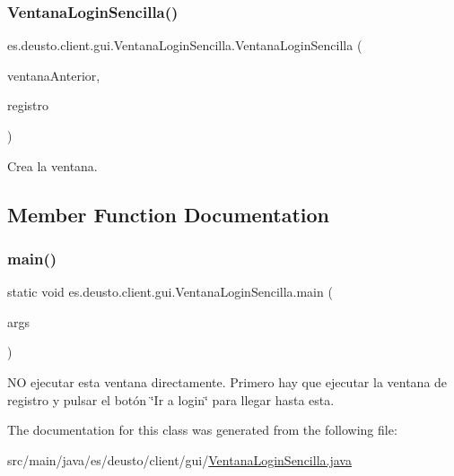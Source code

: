 \subsubsection{\texorpdfstring{VentanaLoginSencilla()}{VentanaLoginSencilla()}}
{\footnotesize\ttfamily es.\+deusto.\+client.\+gui.\+Ventana\+Login\+Sencilla.\+Ventana\+Login\+Sencilla (\begin{DoxyParamCaption}\item[{J\+Frame}]{ventana\+Anterior,  }\item[{final Hash\+Map$<$ String, String $>$}]{registro }\end{DoxyParamCaption})}

Crea la ventana. 

\subsection{Member Function Documentation}
\mbox{\label{classes_1_1deusto_1_1client_1_1gui_1_1_ventana_login_sencilla_aed8d00c2588c75b104e152fe4048413d}} 
\subsubsection{\texorpdfstring{main()}{main()}}
{\footnotesize\ttfamily static void es.\+deusto.\+client.\+gui.\+Ventana\+Login\+Sencilla.\+main (\begin{DoxyParamCaption}\item[{String \mbox{[}$\,$\mbox{]}}]{args }\end{DoxyParamCaption})\hspace{0.3cm}{\ttfamily [static]}}

NO ejecutar esta ventana directamente. Primero hay que ejecutar la ventana de registro y pulsar el botón \char`\"{}\+Ir a login\char`\"{} para llegar hasta esta. 

The documentation for this class was generated from the following file\+:\begin{DoxyCompactItemize}
\item 
src/main/java/es/deusto/client/gui/\mbox{\hyperlink{_ventana_login_sencilla_8java}{Ventana\+Login\+Sencilla.\+java}}\end{DoxyCompactItemize}
